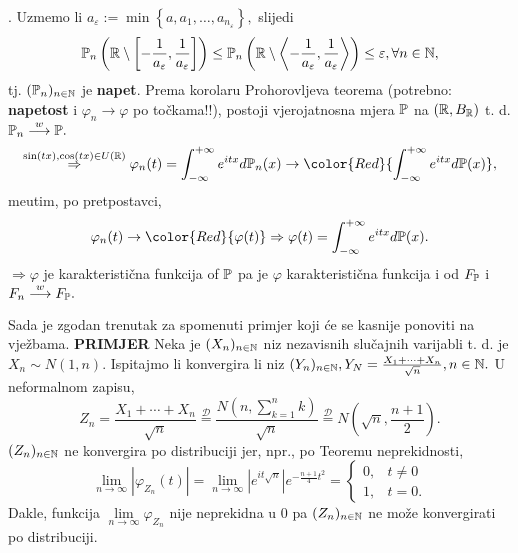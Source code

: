 \documentclass{article}
\begin{document}
\begin{enumerate}
    .\) Uzmemo li \(a_\varepsilon:=\min\left\{a,a_1,\ldots,a_{n_\varepsilon}\right\},\) slijedi \[\Bbb P_n\left(\Bbb R\setminus\left[-\frac1{a_\varepsilon},\frac1{a_\varepsilon}\right]\right)\le\Bbb P_n\left(\Bbb R\setminus\left\langle-\frac1{a_\varepsilon},\frac1{a_\varepsilon}\right\rangle\right)\le\varepsilon,\forall n\in\Bbb N,\] tj. \((\Bbb P_n)_{n\in\Bbb N}\) je \textbf{napet}. Prema korolaru Prohorovljeva teorema (potrebno: \textbf{napetost} i \(\varphi_n\to\varphi\) po točkama!!), postoji vjerojatnosna mjera \(\Bbb P\) na \(\left(\Bbb R,B_{\Bbb R}\right)\) t. d. \(\Bbb P_n\overset{w}{\longrightarrow}\Bbb P.\) \[\overset{\sin(tx),\cos(tx)\in U(\Bbb R)}{\Rightarrow}\varphi_n(t)=\int_{-\infty}^{+\infty}e^{itx}d\Bbb P_n(x)\to{\color{Red}{\int_{-\infty}^{+\infty}e^{itx}d\Bbb P(x)}},\] me\dj{}utim, po pretpostavci, \[\varphi_n(t)\to{\color{Red}{\varphi(t)}}\Rightarrow\varphi(t)=\int_{-\infty}^{+\infty}e^{itx}d\Bbb P(x).\] \(\Rightarrow\varphi\) je karakteristična funkcija of \(\Bbb P\) pa je \(\varphi\) karakteristična funkcija i od \(F_{\Bbb P}\) i \(F_n\overset{w}{\longrightarrow}F_{\Bbb P}.\)  
\end{enumerate}
Sada je zgodan trenutak za spomenuti primjer koji će se kasnije ponoviti na vježbama.\newline\newline
\textbf{PRIMJER}\newline
Neka je \((X_n)_{n\in\Bbb N}\) niz nezavisnih slučajnih varijabli t. d. je \(X_n\sim N(1,n).\) Ispitajmo li konvergira li niz \((Y_n)_{n\in\Bbb N},Y_N=\frac{X_1+\cdots+X_n}{\sqrt n},n\in\Bbb N.\) U neformalnom zapisu, \[Z_n=\frac{X_1+\cdots+X_n}{\sqrt n}\overset{\mathcal D}{=}\frac{N\left(n,\sum_{k=1}^nk\right)}{\sqrt n}\overset{\mathcal D}{=}N\left(\sqrt n,\frac{n+1}2\right).\] \((Z_n)_{n\in\Bbb N}\) ne konvergira po distribuciji jer, npr., po Teoremu neprekidnosti, \[\lim_{n\to\infty}\left|\varphi_{Z_n}(t)\right|=\lim_{n\to\infty}\left|e^{it\sqrt n}\right|e^{-\frac{n+1}4t^2}=\begin{cases}0,&t\ne 0\\1,&t=0.\end{cases}\] Dakle, funkcija \(\lim\limits_{n\to\infty}\varphi_{Z_n}\) nije neprekidna u \(0\) pa \((Z_n)_{n\in\Bbb N}\) ne može konvergirati po distribuciji.\newline\newline
\end{document}
